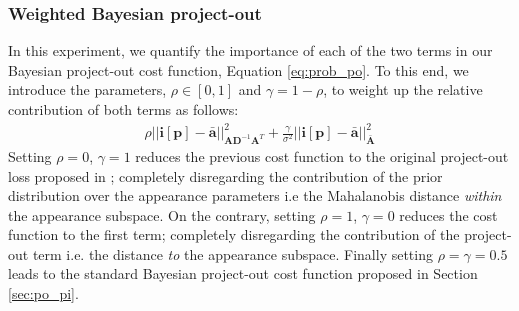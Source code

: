 





\subsubsection{Weighted Bayesian project-out}

In this experiment, we quantify the importance of each of the two terms in our Bayesian project-out cost function, Equation \ref{eq:prob_po}. To this end, we introduce the parameters, $\rho \in [0, 1]$ and $\gamma = 1 - \rho$, to weight up the relative contribution of both terms as follows:
\begin{equation}
    \begin{aligned}
        \rho|| \mathbf{i}[\mathbf{p}] - \mathbf{\bar{a}} ||^2_{\mathbf{A}\mathbf{D}^{-1}\mathbf{A}^T} 
        + 
        \frac{\gamma}{\sigma^2}|| \mathbf{i}[\mathbf{p}] - \mathbf{\bar{a}} ||^2_{\bar{\mathbf{A}}}
    \end{aligned}
    \label{eq:weighted_po}
\end{equation}
Setting $\rho=0$, $\gamma=1$ reduces the previous cost function to the original project-out loss proposed in \cite{Matthews2004}; completely disregarding the contribution of the prior distribution over the appearance parameters i.e the Mahalanobis distance \emph{within} the appearance subspace. On the contrary, setting $\rho=1$, $\gamma=0$ reduces the cost function to the first term; completely disregarding the contribution of the project-out term i.e. the distance \emph{to} the appearance subspace. Finally setting $\rho=\gamma=0.5$ leads to the standard Bayesian project-out cost function proposed in Section \ref{sec:po_pi}.
 
